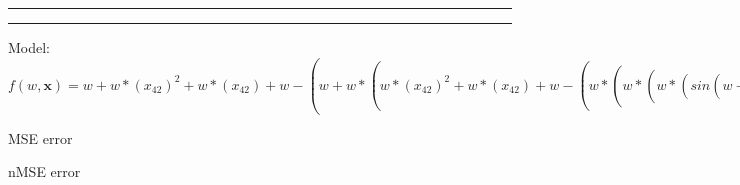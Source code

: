 \documentclass[12pt]{article}
\begin{document}
\hrule
\vspace{1cm}
\hrule
\vspace{1cm}
Model: $f(w,\mathbf{x})=w+w*(x_42)^2+w*(x_42)+w-(w+w*(w*(x_42)^2+w*(x_42)+w-(w*(w*(w*(sin(w+x_13-(w*(w+w+x_21)^2+w*(w+w+x_21)+w)))^2+w*(sin(w+x_13-(w*(w+w+x_21)^2+w*(w+w+x_21)+w)))+w)^2+w*(w*(sin(w+x_13-(w*(w+w+x_21)^2+w*(w+w+x_21)+w)))^2+w*(sin(w+x_13-(w*(w+w+x_21)^2+w*(w+w+x_21)+w)))+w)+w-(w+w+x_21-(w*(x_21)^2+w*(x_21)+w)))^2+w*(w*(w*(sin(w+x_13-(w*(w+w+x_21)^2+w*(w+w+x_21)+w)))^2+w*(sin(w+x_13-(w*(w+w+x_21)^2+w*(w+w+x_21)+w)))+w)^2+w*(w*(sin(w+x_13-(w*(w+w+x_21)^2+w*(w+w+x_21)+w)))^2+w*(sin(w+x_13-(w*(w+w+x_21)^2+w*(w+w+x_21)+w)))+w)+w-(w+w+x_21-(w*(x_21)^2+w*(x_21)+w)))+w)-(w*(x_4)^2+w*(x_4)+w))^2+w*(w*(x_42)^2+w*(x_42)+w-(w*(w*(w*(sin(w+x_13-(w*(w+w+x_21)^2+w*(w+w+x_21)+w)))^2+w*(sin(w+x_13-(w*(w+w+x_21)^2+w*(w+w+x_21)+w)))+w)^2+w*(w*(sin(w+x_13-(w*(w+w+x_21)^2+w*(w+w+x_21)+w)))^2+w*(sin(w+x_13-(w*(w+w+x_21)^2+w*(w+w+x_21)+w)))+w)+w-(w+w+x_21-(w*(x_21)^2+w*(x_21)+w)))^2+w*(w*(w*(sin(w+x_13-(w*(w+w+x_21)^2+w*(w+w+x_21)+w)))^2+w*(sin(w+x_13-(w*(w+w+x_21)^2+w*(w+w+x_21)+w)))+w)^2+w*(w*(sin(w+x_13-(w*(w+w+x_21)^2+w*(w+w+x_21)+w)))^2+w*(sin(w+x_13-(w*(w+w+x_21)^2+w*(w+w+x_21)+w)))+w)+w-(w+w+x_21-(w*(x_21)^2+w*(x_21)+w)))+w)-(w*(x_4)^2+w*(x_4)+w))+w-(w*(x_48)^2+w*(x_48)+w))$

MSE error

nMSE error
\end{document}
